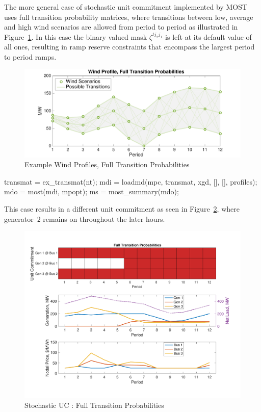 \documentclass[12pt]{article}
\newcommand{\most}[0]{{MOST}}
\numberwithin{equation}{section}
\numberwithin{table}{section}
\numberwithin{figure}{section}
\begin{document}
The more general case of stochastic unit commitment implemented by \most{} uses  full transition probability matrices, where transitions between low, average and high wind scenarios are allowed from period to period as illustrated in Figure~\ref{fig:wind_profile_2}. In this case the binary valued mask $\zeta^{tj_2j_1}$ is left at its default value of all ones, resulting in ramp reserve constraints that encompass the largest period to period ramps.
\begin{figure}[hbtp]
  \centering
  \includegraphics[width=\textwidth]{./figures/wind_profile_2}
  \caption{Example Wind Profiles, Full Transition Probabilities}
  \label{fig:wind_profile_2}
\end{figure}
\begin{Code}
transmat = ex_transmat(nt);
mdi = loadmd(mpc, transmat, xgd, [], [], profiles);
mdo = most(mdi, mpopt);
ms = most_summary(mdo);
\end{Code}
This case results in a different unit commitment as seen in Figure~\ref{fig:suc_ex_3}, where generator~2 remains on throughout the later hours.
\begin{figure}[hbtp]
  \centering
  \includegraphics[width=\textwidth]{./figures/suc-ex-3}
  \caption{Stochastic UC : Full Transition Probabilities}
  \label{fig:suc_ex_3}
\end{figure}
\end{document}
